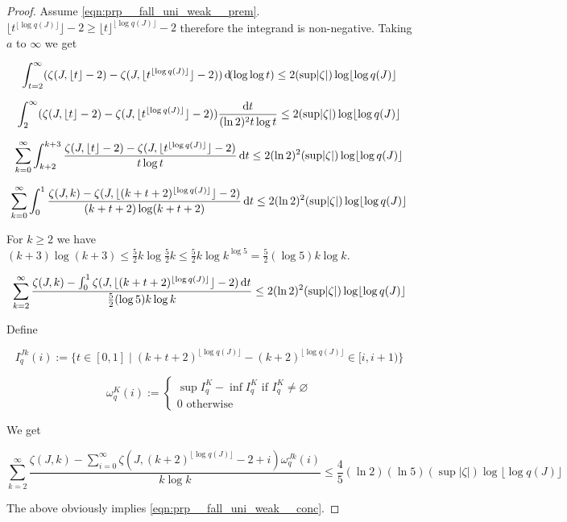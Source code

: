 \documentclass{article}
\numberwithin{equation}{section}
\theoremstyle{definition}
\theoremstyle{plain}
\newcommand{\Abs}[1]{\lvert #1 \rvert}
\newcommand{\Floor}[1]{\lfloor #1 \rfloor}
\begin{document}
\begin{proof}
Assume \ref{eqn:prp__fall_uni_weak__prem}. ${\Floor{t^{\Floor{\log q(J)}}}-2 \geq \Floor{t}^{\Floor{\log q(J)}}-2}$ therefore the integrand is non-negative. Taking ${a}$ to ${\infty}$ we get

\[\int_{t = 2}^{\infty} (\zeta(J,\Floor{t}-2) - \zeta(J,\Floor{t^{\Floor{\log q(J)}}}-2)) \dif (\log \log t) \leq 2(\sup \Abs{\zeta}) \log \Floor{\log q(J)}\]

\[\int_2^\infty (\zeta(J,\Floor{t}-2) - \zeta(J,\Floor{t^{\Floor{\log q(J)}}}-2)) \frac{\dif t}{(\ln 2)^2 t \log t} \leq 2(\sup \Abs{\zeta}) \log \Floor{\log q(J)}\]

\[\sum_{k=0}^\infty \int_{k+2}^{k+3} \frac{\zeta(J,\Floor{t}-2) - \zeta(J,\Floor{t^{\Floor{\log q(J)}}}-2)}{t \log t} \dif t \leq 2(\ln 2)^2(\sup \Abs{\zeta}) \log \Floor{\log q(J)}\]

\[\sum_{k=0}^\infty \int_0^1 \frac{\zeta(J,k) - \zeta(J,\Floor{(k+t+2)^{\Floor{\log q(J)}}}-2)}{(k+t+2) \log (k+t+2)}\dif t \leq 2(\ln 2)^2(\sup \Abs{\zeta}) \log \Floor{\log q(J)}\]

For ${k \geq 2}$ we have ${(k + 3) \log (k + 3) \leq \frac{5}{2}k \log \frac{5}{2}k \leq \frac{5}{2}k \log k^{\log 5} = \frac{5}{2} (\log 5) k \log k}$.

\[\sum_{k=2}^\infty \frac{\zeta(J,k) - \int_0^1 \zeta(J,\Floor{(k+t+2)^{\Floor{\log q(J)}}}-2)\dif t}{\frac{5}{2} (\log 5) k \log k} \leq 2(\ln 2)^2(\sup \Abs{\zeta}) \log \Floor{\log q(J)}\]

Define

\[I_q^{Jk}(i):=\{t \in [0,1] \mid (k+t+2)^{\Floor{\log q(J)}} - (k+2)^{\Floor{\log q(J)}} \in [i,i+1)\}\]

\[\omega_q^K(i):=\begin{cases}\sup I_q^K-\inf I_q^K \text{ if } I_q^K \ne \varnothing\\0 \text{ otherwise}\end{cases}\]

We get

\[\sum_{k=2}^\infty \frac{\zeta(J,k) - \sum_{i=0}^\infty \zeta(J,(k+2)^{\Floor{\log q(J)}}-2+i)\omega_q^{Jk}(i) }{k \log k}  \leq \frac{4}{5}(\ln 2)(\ln 5)(\sup \Abs{\zeta}) \log \Floor{\log q(J)}\]

The above obviously implies \ref{eqn:prp__fall_uni_weak__conc}.
%
\end{proof}
\end{document}
